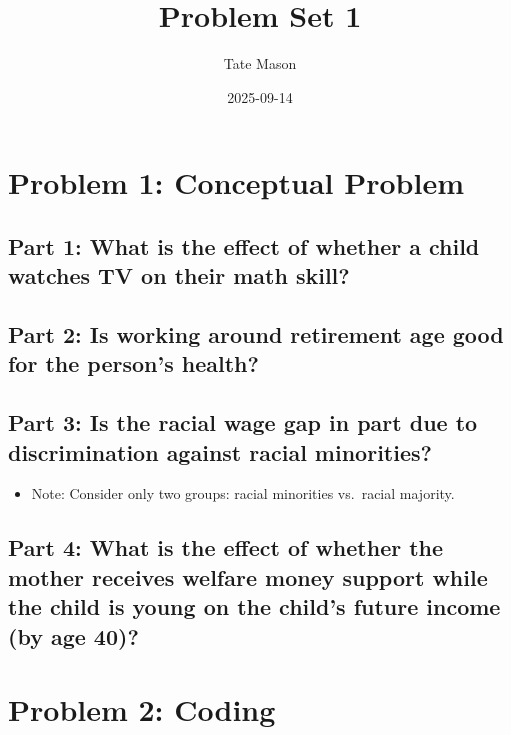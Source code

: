 \documentclass[
  letterpaper,
  DIV=11,
  numbers=noendperiod]{scrartcl}
\title{Problem Set 1}
\author{Tate Mason}
\date{2025-09-14}
\providecommand{\tightlist}{%
  \setlength{\itemsep}{0pt}\setlength{\parskip}{0pt}}
\begin{document}
\maketitle


\section{Problem 1: Conceptual
Problem}\label{problem-1-conceptual-problem}

\subsection{Part 1: What is the effect of whether a child watches TV on
their math
skill?}\label{part-1-what-is-the-effect-of-whether-a-child-watches-tv-on-their-math-skill}

\subsection{Part 2: Is working around retirement age good for the
person's
health?}\label{part-2-is-working-around-retirement-age-good-for-the-persons-health}

\subsection{Part 3: Is the racial wage gap in part due to discrimination
against racial
minorities?}\label{part-3-is-the-racial-wage-gap-in-part-due-to-discrimination-against-racial-minorities}

\begin{itemize}
\tightlist
\item
  Note: Consider only two groups: racial minorities vs.~racial majority.
\end{itemize}

\subsection{Part 4: What is the effect of whether the mother receives
welfare money support while the child is young on the child's future
income (by age
40)?}\label{part-4-what-is-the-effect-of-whether-the-mother-receives-welfare-money-support-while-the-child-is-young-on-the-childs-future-income-by-age-40}

\section{Problem 2: Coding}\label{problem-2-coding}
\end{document}
